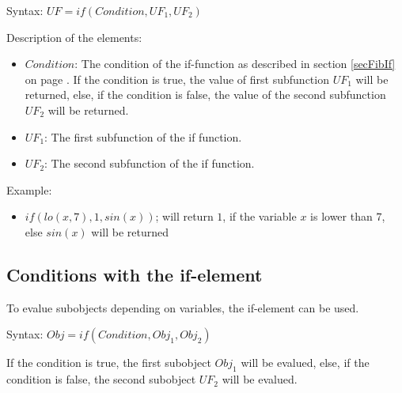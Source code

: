 \bigskip\noindent
Syntax:
$UF=if( Condition, UF_1, UF_2 )$

\bigskip\noindent
Description of the elements:
\begin{itemize}
 \item $Condition$: The condition of the if-function as described in section \ref{secFibIf} on page \pageref{secFibIf}. If the condition is true, the value of first subfunction $UF_1$ will be returned, else, if the condition is false, the value of the second subfunction $UF_2$ will be returned.
 \item $UF_1$: The first subfunction of the if function.
 \item $UF_2$: The second subfunction of the if function.
\end{itemize}

\bigskip\noindent
Example:
\begin{itemize}
 \item $if( lo(x,7), 1, sin(x) )$; will return $1$, if the variable $x$ is lower than $7$, else $sin(x)$ will be returned
\end{itemize}



\subsection{Conditions with the if-element}
\label{secFibIf}

To evalue subobjects depending on variables, the if-element can be used.

\bigskip\noindent
Syntax:
$Obj=if( Condition, Obj_1, Obj_2)$

If the condition is true, the first subobject $Obj_1$ will be evalued, else, if the condition is false, the second subobject $UF_2$ will be evalued.

